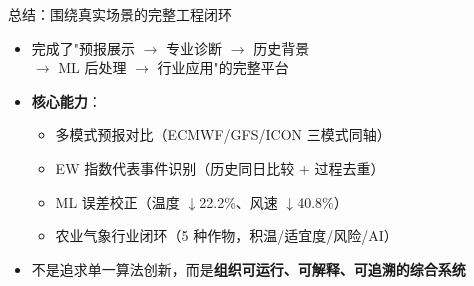 \documentclass[aspectratio=169,14pt]{beamer}
\begin{document}
\begin{frame}{总结：围绕真实场景的完整工程闭环}
  \begin{itemize}
    \item 完成了"预报展示 $\rightarrow$ 专业诊断 $\rightarrow$ 历史背景\\\hspace{6mm}$\rightarrow$ ML 后处理 $\rightarrow$ 行业应用"的完整平台
    \item \textbf{核心能力}：
      \begin{itemize}
        \item 多模式预报对比（ECMWF/GFS/ICON 三模式同轴）
        \item EW 指数代表事件识别（历史同日比较 + 过程去重）
        \item ML 误差校正（温度 $\downarrow$22.2\%、风速 $\downarrow$40.8\%）
        \item 农业气象行业闭环（5 种作物，积温/适宜度/风险/AI）
      \end{itemize}
    \item 不是追求单一算法创新，而是\textbf{组织可运行、可解释、可追溯的综合系统}
  \end{itemize}
\end{frame}
\end{document}
